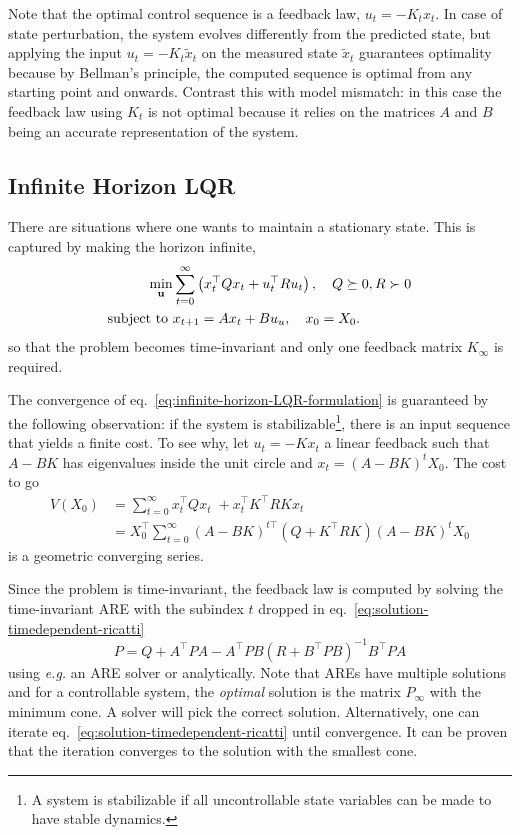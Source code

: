 Note that the optimal control sequence is a feedback law, $u_t=-K_tx_t$. In case of state perturbation, the system evolves differently from the predicted state, but applying the input $u_t=-K_t\tilde{x}_t$ on the measured state $\tilde{x}_t$ guarantees optimality because by Bellman's principle, the computed sequence is optimal from any starting point and onwards. Contrast this with model mismatch: in this case the feedback law using $K_t$ is not optimal because it relies on the matrices $A$ and $B$ being an accurate representation of the system.

\subsection{Infinite Horizon LQR}
\label{sec:infinite-horizon-LQR}

There are situations where one wants to maintain a stationary state. This is captured by making the horizon infinite,
\begin{equation}
  \label{eq:infinite-horizon-LQR-formulation}
  \begin{aligned}
    \min_{\boldsymbol{\mathrm{u}}} &\sum_{t=0}^\infty \left(x_t^\top Qx_t + u_t^\top Ru_t \right),\quad Q\succeq 0, R\succ 0 \\
    \text{subject to } &x_{t+1} = Ax_t + Bu_u,\quad x_0=X_0.
  \end{aligned}
\end{equation}
so that the problem becomes time-invariant and only one feedback matrix $K_\infty$ is required.

The convergence of eq.~\eqref{eq:infinite-horizon-LQR-formulation} is guaranteed by the following observation: if the system is stabilizable\footnote{A system is stabilizable if all uncontrollable state variables can be made to have stable dynamics.}, there is an input sequence that yields a finite cost. To see why, let $u_t = -Kx_t$ a linear feedback such that $A-BK$ has eigenvalues inside the unit circle and $x_t=(A-BK)^tX_0$. The cost to go
\begin{align*}
  V(X_0) &= \sum_{t=0}^\infty x_t^\top Qx_t^{\phantom{\top}} + x_t^\top K^\top RKx_t \\
         &= X_0^\top \sum_{t=0}^\infty (A-BK)^{t\top}\left(Q+K^\top RK\right)(A-BK)^tX_0
\end{align*}
is a geometric converging series.

Since the problem is time-invariant, the feedback law is computed by solving the time-invariant ARE with the subindex $t$ dropped in eq.~\eqref{eq:solution-timedependent-ricatti}
\begin{equation*}
  P = Q + A^\top P A - A^\top P B\left(R + B^\top PB\right)^{-1}B^\top P A
\end{equation*}
using \textit{e.g.} an ARE solver or analytically. Note that AREs have multiple solutions and for a controllable system, the \emph{optimal} solution is the matrix $P_\infty$ with the minimum cone. A solver will pick the correct solution. Alternatively, one can iterate eq.~\eqref{eq:solution-timedependent-ricatti} until convergence. It can be proven that the iteration converges to the solution with the smallest cone.

